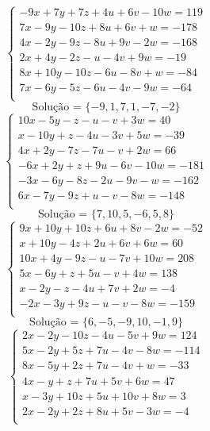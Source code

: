 \documentclass[12pt,oneside,a4paper]{article}
\begin{document}
\vspace{\baselineskip}
\begin{equation*}
\begin{cases}
-9x+7y+7z+4u+6v-10w=119 \\
7x-9y-10z+8u+6v+w=-178 \\
4x-2y-9z-8u+9v-2w=-168 \\
2x+4y-2z-u-4v+9w=-19 \\
8x+10y-10z-6u-8v+w=-84 \\
7x-6y-5z-6u-4v-9w=-64 \\
\end{cases}
\end{equation*}
\begin{equation*}
\text{Solução = }\{-9,1,7,1,-7,-2\}
\end{equation*}
\vspace{\baselineskip}
\begin{equation*}
\begin{cases}
10x-5y-z-u-v+3w=40 \\
x-10y+z-4u-3v+5w=-39 \\
4x+2y-7z-7u-v+2w=66 \\
-6x+2y+z+9u-6v-10w=-181 \\
-3x-6y-8z-2u-9v-w=-162 \\
6x-7y-9z+u-v-8w=-148 \\
\end{cases}
\end{equation*}
\begin{equation*}
\text{Solução = }\{7,10,5,-6,5,8\}
\end{equation*}
\vspace{\baselineskip}
\begin{equation*}
\begin{cases}
9x+10y+10z+6u+8v-2w=-52 \\
x+10y-4z+2u+6v+6w=60 \\
10x+4y-9z-u-7v+10w=208 \\
5x-6y+z+5u-v+4w=138 \\
x-2y-z-4u+7v+2w=-4 \\
-2x-3y+9z-u-v-8w=-159 \\
\end{cases}
\end{equation*}
\begin{equation*}
\text{Solução = }\{6,-5,-9,10,-1,9\}
\end{equation*}
\vspace{\baselineskip}
\begin{equation*}
\begin{cases}
2x-2y-10z-4u-5v+9w=124 \\
5x-2y+5z+7u-4v-8w=-114 \\
8x-5y+2z+7u-4v+w=-33 \\
4x-y+z+7u+5v+6w=47 \\
x-3y+10z+5u+10v+8w=3 \\
2x-2y+2z+8u+5v-3w=-4 \\
\end{cases}
\end{equation*}
\end{document}
